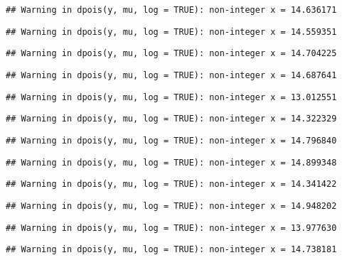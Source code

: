\documentclass[
]{article}
\begin{document}
\begin{verbatim}
## Warning in dpois(y, mu, log = TRUE): non-integer x = 14.636171
\end{verbatim}

\begin{verbatim}
## Warning in dpois(y, mu, log = TRUE): non-integer x = 14.559351
\end{verbatim}

\begin{verbatim}
## Warning in dpois(y, mu, log = TRUE): non-integer x = 14.704225
\end{verbatim}

\begin{verbatim}
## Warning in dpois(y, mu, log = TRUE): non-integer x = 14.687641
\end{verbatim}

\begin{verbatim}
## Warning in dpois(y, mu, log = TRUE): non-integer x = 13.012551
\end{verbatim}

\begin{verbatim}
## Warning in dpois(y, mu, log = TRUE): non-integer x = 14.322329
\end{verbatim}

\begin{verbatim}
## Warning in dpois(y, mu, log = TRUE): non-integer x = 14.796840
\end{verbatim}

\begin{verbatim}
## Warning in dpois(y, mu, log = TRUE): non-integer x = 14.899348
\end{verbatim}

\begin{verbatim}
## Warning in dpois(y, mu, log = TRUE): non-integer x = 14.341422
\end{verbatim}

\begin{verbatim}
## Warning in dpois(y, mu, log = TRUE): non-integer x = 14.948202
\end{verbatim}

\begin{verbatim}
## Warning in dpois(y, mu, log = TRUE): non-integer x = 13.977630
\end{verbatim}

\begin{verbatim}
## Warning in dpois(y, mu, log = TRUE): non-integer x = 14.738181
\end{verbatim}
\end{document}
